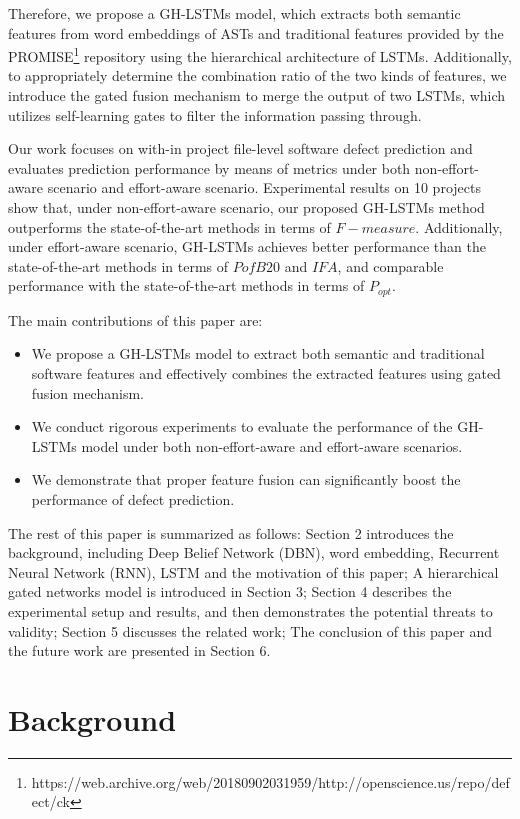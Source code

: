 \documentclass[journal]{IEEEtran}
\begin{document}
Therefore, we propose a GH-LSTMs model, which extracts both semantic features from word embeddings of ASTs and traditional features provided by the PROMISE\footnote{https://web.archive.org/web/20180902031959/http://openscience.us/repo/defect/ck} repository using the hierarchical architecture of LSTMs. Additionally, to appropriately determine the combination ratio of the two kinds of features, we introduce the gated fusion mechanism to merge the output of two LSTMs, which utilizes self-learning gates to filter the information passing through.


Our work focuses on with-in project file-level software defect prediction and evaluates prediction performance by means of metrics under both non-effort-aware scenario and effort-aware scenario. Experimental results on 10 projects show that, under non-effort-aware scenario, our proposed GH-LSTMs method outperforms the state-of-the-art methods in terms of $F-measure$. Additionally, under effort-aware scenario, GH-LSTMs achieves better performance than the state-of-the-art methods in terms of $PofB20$ and $IFA$, and comparable performance with the state-of-the-art methods in terms of $P_{opt}$.


The main contributions of this paper are:
\begin{itemize}
	\item We propose a GH-LSTMs model to extract both semantic and traditional software features and effectively combines the extracted features using gated fusion mechanism.
	\item We conduct rigorous experiments to evaluate the performance of the GH-LSTMs model under both non-effort-aware and effort-aware scenarios.
	\item We demonstrate that proper feature fusion can significantly boost the performance of defect prediction.
\end{itemize}


The rest of this paper is summarized as follows: Section 2 introduces the background, including Deep Belief Network (DBN), word embedding, Recurrent Neural Network (RNN), LSTM and the motivation of this paper; A hierarchical gated networks model is introduced in Section 3; Section 4 describes the experimental setup and results, and then demonstrates the potential threats to validity; Section 5 discusses the related work; The conclusion of this paper and the future work are presented in Section 6.

\section{Background}
\end{document}
